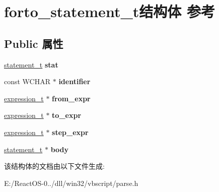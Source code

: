 \hypertarget{structforto__statement__t}{}\section{forto\+\_\+statement\+\_\+t结构体 参考}
\label{structforto__statement__t}
\subsection*{Public 属性}
\begin{DoxyCompactItemize}
\item 
\mbox{\label{structforto__statement__t_a8815604421da82874f353f7679d9eeb7}} 
\hyperlink{struct__statement__t}{statement\+\_\+t} {\bfseries stat}
\item 
\mbox{\label{structforto__statement__t_ac483cc8498c8e29d3d48fc708a3d05bc}} 
const W\+C\+H\+AR $\ast$ {\bfseries identifier}
\item 
\mbox{\label{structforto__statement__t_a79571d1f8fdd60022e5de55777d51b4d}} 
\hyperlink{struct__expression__t}{expression\+\_\+t} $\ast$ {\bfseries from\+\_\+expr}
\item 
\mbox{\label{structforto__statement__t_ac0fcf6a51fe2c78a48c807a000ec6a11}} 
\hyperlink{struct__expression__t}{expression\+\_\+t} $\ast$ {\bfseries to\+\_\+expr}
\item 
\mbox{\label{structforto__statement__t_a73353c7db2bf8140bb60bb6d920d07b4}} 
\hyperlink{struct__expression__t}{expression\+\_\+t} $\ast$ {\bfseries step\+\_\+expr}
\item 
\mbox{\label{structforto__statement__t_a01ab442e5ebd747c075152954e1e39ec}} 
\hyperlink{struct__statement__t}{statement\+\_\+t} $\ast$ {\bfseries body}
\end{DoxyCompactItemize}


该结构体的文档由以下文件生成\+:\begin{DoxyCompactItemize}
\item 
E\+:/\+React\+O\+S-\/0../dll/win32/vbscript/parse.\+h\end{DoxyCompactItemize}
